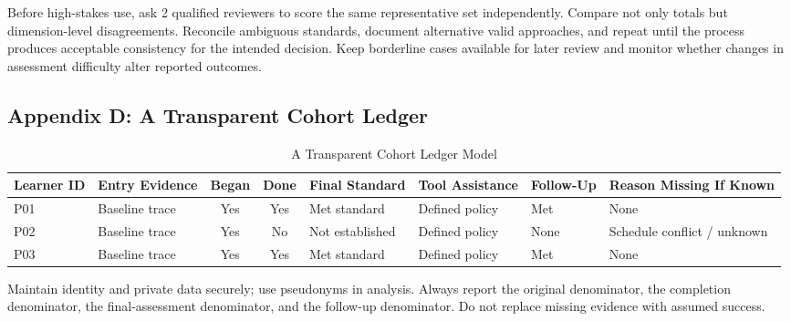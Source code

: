 Before high-stakes use, ask 2 qualified reviewers to score the same representative set independently. Compare not only totals but dimension-level disagreements. Reconcile ambiguous standards, document alternative valid approaches, and repeat until the process produces acceptable consistency for the intended decision. Keep borderline cases available for later review and monitor whether changes in assessment difficulty alter reported outcomes.

\subsection*{Appendix D: A Transparent Cohort Ledger}

\begin{table}[t]
\centering
\footnotesize
\caption{A Transparent Cohort Ledger Model}
\begin{tabularx}{\textwidth}{p{}p{}ccp{}p{}p{}X}
\toprule
\textbf{Learner ID} & \textbf{Entry Evidence} & \textbf{Began} & \textbf{Done} & \textbf{Final Standard} & \textbf{Tool Assistance} & \textbf{Follow-Up} & \textbf{Reason Missing If Known} \\
\midrule
P01 & Baseline trace & Yes & Yes & Met standard & Defined policy & Met & None \\
P02 & Baseline trace & Yes & No & Not established & Defined policy & None & Schedule conflict / unknown \\
P03 & Baseline trace & Yes & Yes & Met standard & Defined policy & Met & None \\
\bottomrule
\end{tabularx}
\end{table}

Maintain identity and private data securely; use pseudonyms in analysis. Always report the original denominator, the completion denominator, the final-assessment denominator, and the follow-up denominator. Do not replace missing evidence with assumed success.
